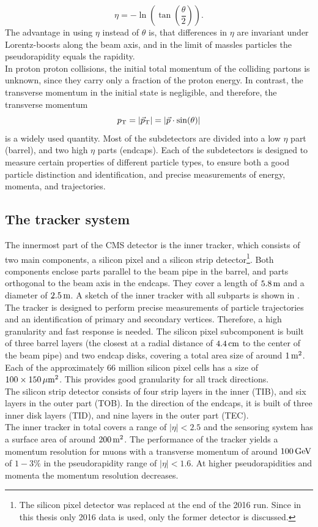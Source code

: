 \begin{equation}
 \eta=-\ln\left(\tan\left(\frac{\theta}{2}\right)\right).
\end{equation}
The advantage in using $\eta$ instead of $\theta$ is, that differences in $\eta$ are invariant under Lorentz-boosts along the beam axis, and in the limit of massles particles the pseudorapidity equals the rapidity.\\
In proton proton collisions, the initial total momentum of the colliding partons is unknown, since they carry only a fraction of the proton energy. In contrast, the transverse momentum in the initial state is negligible, and therefore, the transverse momentum
\begin{equation}
 p_{\mathrm{T}}=|{\vec p}_{\mathrm{T}}|=|\vec{p}\cdot\sin(\theta)|
\end{equation}
is a widely used quantity.
Most of the subdetectors are divided into a low $\eta$ part (barrel), and two high $\eta$ parts (endcaps). Each of the subdetectors is designed to measure  certain properties of different particle types, to ensure both a good particle distinction and identification, and precise measurements of energy, momenta, and trajectories.



\subsection{The tracker system}
The innermost part of the CMS detector is the inner tracker, which consists of two main components, a silicon pixel and a silicon strip detector\footnote{The silicon pixel detector was replaced at the end of the 2016 run. Since in this thesis only 2016 data is used, only the former detector is discussed.}. Both components enclose parts parallel to the beam pipe in the barrel, and parts orthogonal to the beam axis in the endcaps. They cover a length of $5.8\,\text{m}$ and a diameter of $2.5\,\text{m}$. A sketch of the inner tracker with all subparts is shown in . The tracker is designed to perform precise measurements of particle trajectories and an identification of primary and secondary vertices. Therefore, a high granularity and fast response is needed. The silicon pixel subcomponent is built of three barrel layers (the closest at a radial distance of $4.4\,\text{cm}$ to the center of the beam pipe) and two endcap disks, covering a total area size of around $1\,\text{m}^2$. Each of the approximately $66$ million silicon pixel cells has a size of $100\times150\,\mu\text{m}^2$. This provides good granularity for all track directions.\\
The silicon strip detector consists of four strip layers in the inner (TIB), and six layers in the outer part (TOB). In the direction of the endcaps, it is built of three inner disk layers (TID), and nine layers in the outer part (TEC).\\
The inner tracker in total covers a range of $|\eta|<2.5$ and the sensoring system has a surface area of around $200\,\text{m}^2$. The performance of the tracker yields a momentum resolution for muons with a transverse momentum of around $100\,\text{Ge\hspace{-.08em}V}$ of $1-3\%$ in the pseudorapidity range of $|\eta|<1.6$. At higher pseudorapidities and momenta the momentum resolution decreases.

